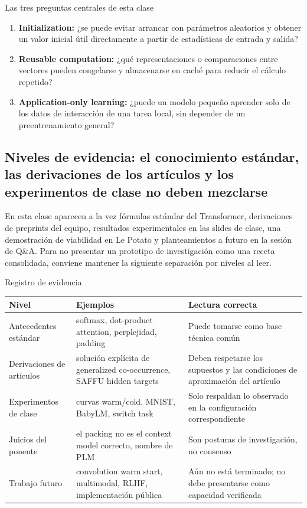 \begin{importantbox}{Las tres preguntas centrales de esta clase}
\begin{enumerate}
  \item \textbf{Initialization:} ¿se puede evitar arrancar con parámetros aleatorios y obtener un valor inicial útil directamente a partir de estadísticas de entrada y salida?
  \item \textbf{Reusable computation:} ¿qué representaciones o comparaciones entre vectores pueden congelarse y almacenarse en caché para reducir el cálculo repetido?
  \item \textbf{Application-only learning:} ¿puede un modelo pequeño aprender solo de los datos de interacción de una tarea local, sin depender de un preentrenamiento general?
\end{enumerate}
\end{importantbox}


\subsection{Niveles de evidencia: el conocimiento estándar, las derivaciones de los artículos y los experimentos de clase no deben mezclarse}

En esta clase aparecen a la vez fórmulas estándar del Transformer, derivaciones de preprints del equipo, resultados experimentales en las slides de clase, una demostración de viabilidad en Le Potato y planteamientos a futuro en la sesión de Q\&A. Para no presentar un prototipo de investigación como una receta consolidada, conviene mantener la siguiente separación por niveles al leer.

\begin{knowledgebox}{Registro de evidencia}
\begin{tabularx}{\textwidth}{L{0.17\textwidth} L{0.29\textwidth} X}
\toprule
Nivel & Ejemplos & Lectura correcta \\
\midrule
Antecedentes estándar & softmax, dot-product attention, perplejidad, padding & Puede tomarse como base técnica común \\
Derivaciones de artículos & solución explícita de generalized co-occurrence, SAFFU hidden targets & Deben respetarse los supuestos y las condiciones de aproximación del artículo \\
Experimentos de clase & curvas warm/cold, MNIST, BabyLM, switch task & Solo respaldan lo observado en la configuración correspondiente \\
Juicios del ponente & el packing no es el context model correcto, nombre de PLM & Son posturas de investigación, no consenso \\
Trabajo futuro & convolution warm start, multimodal, RLHF, implementación pública & Aún no está terminado; no debe presentarse como capacidad verificada \\
\bottomrule
\end{tabularx}
\end{knowledgebox}


